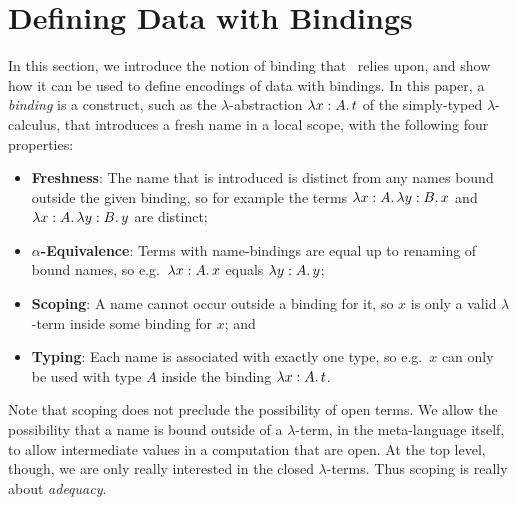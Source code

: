 \documentclass[natbib]{sigplanconf}
\newcommand{\mynote}[2]{\fbox{\bfseries\sffamily\scriptsize#1}
  {\small$\blacktriangleright$\textsf{\emph{#2}}$\blacktriangleleft$}}
\newcommand{\mynote}[2]{}
\newcommand{\noteP}[1]{\mynote{Paul}{#1}}
\begin{document}
\section{Defining Data with Bindings}
\label{sec:data-with-bindings}

In this section, we introduce the notion of binding that \ourlib\
relies upon, and show how it can be used to define encodings of data
with bindings. In this paper, a \emph{binding} is a construct, such
as the $\lambda$-abstraction $\lambda x:A.\, t$ of the simply-typed
$\lambda$-calculus, that introduces a fresh name in a local scope,
with the following four properties:
\begin{itemize}
\item \textbf{Freshness}: The name that is introduced is distinct from
  any names bound outside the given binding, so for example the terms
  $\lambda x:A.\, \lambda y:B.\, x$ and
  $\lambda x:A.\, \lambda y:B.\, y$ are distinct;
%
\item \textbf{$\alpha$-Equivalence}: Terms with name-bindings are
  equal up to renaming of bound names, so e.g.\ $\lambda x:A.\, x$
  equals $\lambda y:A.\, y$;
%
\item \textbf{Scoping}: A name cannot occur outside a binding for it,
  so $x$ is only a valid $\lambda$-term inside some binding for $x$;
  and
%
\item \textbf{Typing}: Each name is associated with exactly one type,
  so e.g.\ $x$ can only be used with type $A$ inside the binding
  $\lambda x:A.\, t$.
\end{itemize}
Note that scoping does not preclude the possibility of open terms. We
allow the possibility that a name is bound outside of a
$\lambda$-term, in the meta-language itself, to allow intermediate
values in a computation that are open. At the top level, though, we
are only really interested in the closed $\lambda$-terms. Thus scoping
is really about \emph{adequacy}.
\end{document}
